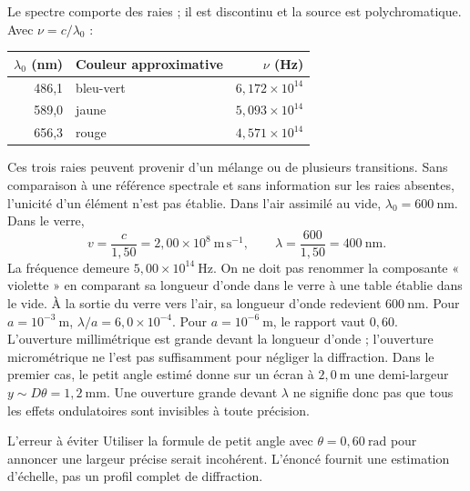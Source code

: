 Le spectre comporte des raies ; il est discontinu et la source est polychromatique. Avec $\nu=c/\lambda_0$ :
\begin{center}\begin{tabular}{r l r}
\toprule $\lambda_0$ (nm)&Couleur approximative&$\nu$ (Hz)\\\midrule
486,1&bleu-vert&$6{,}172\times10^{14}$\\
589,0&jaune&$5{,}093\times10^{14}$\\
656,3&rouge&$4{,}571\times10^{14}$\\\bottomrule
\end{tabular}\end{center}
Ces trois raies peuvent provenir d'un mélange ou de plusieurs transitions. Sans comparaison à une référence spectrale et sans information sur les raies absentes, l'unicité d'un élément n'est pas établie.
Dans l'air assimilé au vide, $\lambda_0=600\ \mathrm{nm}$. Dans le verre,
\[v=\frac{c}{1{,}50}=2{,}00\times10^8\ \mathrm{m\,s^{-1}},\qquad
\lambda=\frac{600}{1{,}50}=400\ \mathrm{nm}.\]
La fréquence demeure $5{,}00\times10^{14}\ \mathrm{Hz}$. On ne doit pas renommer la composante « violette » en comparant sa longueur d'onde dans le verre à une table établie dans le vide. À la sortie du verre vers l'air, sa longueur d'onde redevient $600\ \mathrm{nm}$.
Pour $a=10^{-3}\ \mathrm{m}$, $\lambda/a=6{,}0\times10^{-4}$. Pour $a=10^{-6}\ \mathrm{m}$, le rapport vaut $0{,}60$. L'ouverture millimétrique est grande devant la longueur d'onde ; l'ouverture micrométrique ne l'est pas suffisamment pour négliger la diffraction.
Dans le premier cas, le petit angle estimé donne sur un écran à $2{,}0\ \mathrm{m}$ une demi-largeur $y\sim D\theta=1{,}2\ \mathrm{mm}$. Une ouverture grande devant $\lambda$ ne signifie donc pas que tous les effets ondulatoires sont invisibles à toute précision.
\begin{piege}{L'erreur à éviter}
Utiliser la formule de petit angle avec $\theta=0{,}60\ \mathrm{rad}$ pour annoncer une largeur précise serait incohérent. L'énoncé fournit une estimation d'échelle, pas un profil complet de diffraction.
\end{piege}

